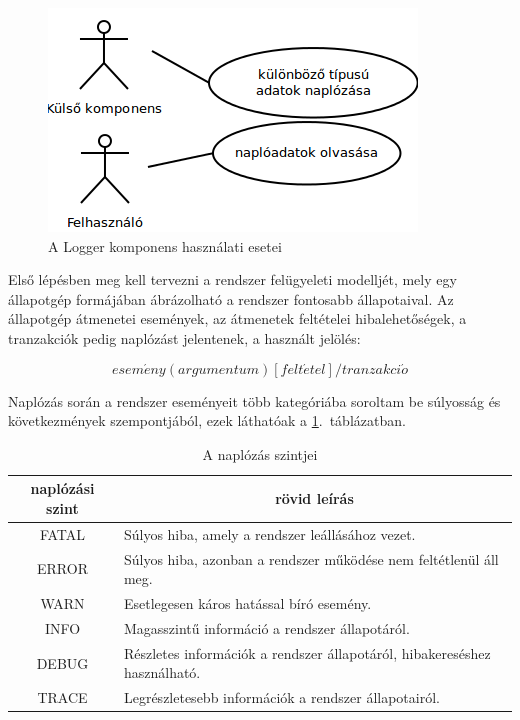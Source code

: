 \begin{figure}[htp]
\centering
\includegraphics[scale=0.5]{img/usecase_logger}
\caption{A Logger komponens használati esetei}
\label{fig:usecase_logger}
\end{figure}

Első lépésben meg kell tervezni a rendszer felügyeleti modelljét, mely egy állapotgép formájában ábrázolható a rendszer fontosabb állapotaival. Az állapotgép átmenetei események, az átmenetek feltételei hibalehetőségek, a tranzakciók pedig naplózást jelentenek, a használt jelölés:

\begin{equation}
	esem\acute{e}ny(argumentum) [felt\acute{e}tel] / tranzakci\acute{o}
\end{equation}

Naplózás során a rendszer eseményeit több kategóriába soroltam be súlyosság és következmények szempontjából, ezek láthatóak a \ref{tab:loglevels}.~táblázatban.

\begin{table}[htb]
\begin{center}
\begin{tabular}{|c|l|}
\hline
\multicolumn{1}{|c|}{\textbf{naplózási szint}} & \multicolumn{1}{|c|}{\textbf{rövid leírás}} \\ \hline \hline
FATAL & Súlyos hiba, amely a rendszer leállásához vezet. \\ \hline
ERROR & Súlyos hiba, azonban a rendszer működése nem feltétlenül áll meg. \\ \hline
WARN  & Esetlegesen káros hatással bíró esemény. \\ \hline
INFO  & Magasszintű információ a rendszer állapotáról. \\ \hline
DEBUG & Részletes információk a rendszer állapotáról, hibakereséshez használható. \\ \hline
TRACE & Legrészletesebb információk a rendszer állapotairól. \\
\hline
\end{tabular}
\end{center}
\caption{\label{tab:loglevels} A naplózás szintjei}
\end{table}


